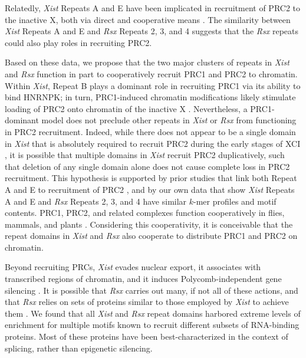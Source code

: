 Relatedly, \emph{Xist} Repeats A and E have been implicated in recruitment of PRC2 to the inactive X, both via direct and cooperative means \cite{Almeida2017PCGF3/5-PRC1Inactivation,Cifuentes-Rojas2014Regulatory2,Davidovich2015TowardRNA,Kohlmaier2004AInactivation,Ridings-Figueroa2017TheTerritory,Sunwoo2017RepeatCIZ1,Wang2017TargetingGuanines,Zhao2008PolycombChromosome}. The similarity between \emph{Xist} Repeats A and E and \emph{Rsx} Repeats 2, 3, and 4 suggests that the \emph{Rsx} repeats could also play roles in recruiting PRC2. 

Based on these data, we propose that the two major clusters of repeats in \emph{Xist} and \emph{Rsx} function in part to cooperatively recruit PRC1 and PRC2 to chromatin. Within \emph{Xist}, Repeat B plays a dominant role in recruiting PRC1 via its ability to bind HNRNPK; in turn, PRC1-induced chromatin modifications likely stimulate loading of PRC2 onto chromatin of the inactive X \cite{Almeida2017PCGF3/5-PRC1Inactivation,Pintacuda2017HnRNPKSilencing}. Nevertheless, a PRC1-dominant model does not preclude other repeats in \emph{Xist} or \emph{Rsx} from functioning in PRC2 recruitment. Indeed, while there does not appear to be a single domain in \emph{Xist} that is absolutely required to recruit PRC2 during the early stages of XCI \cite{Kohlmaier2004AInactivation,Wutz2002ChromosomalRNA}, it is possible that multiple domains in \emph{Xist} recruit PRC2 duplicatively, such that deletion of any single domain alone does not cause complete loss in PRC2 recruitment. This hypothesis is supported by prior studies that link both Repeat A and E to recruitment of PRC2 \cite{Almeida2017PCGF3/5-PRC1Inactivation,Cifuentes-Rojas2014Regulatory2,Davidovich2015TowardRNA,Kohlmaier2004AInactivation,Ridings-Figueroa2017TheTerritory,Sunwoo2017RepeatCIZ1,Wang2017TargetingGuanines,Zhao2008PolycombChromosome}, and by our own data that show \emph{Xist} Repeats A and E and \emph{Rsx} Repeats 2, 3, and 4 have similar $k$-mer profiles and motif contents. PRC1, PRC2, and related complexes function cooperatively in flies, mammals, and plants \cite{Blackledge2015TargetingStory,Li2018Polycomb-mediatedPlants,Schuettengruber2014CooperativityDrosophila}. Considering this cooperativity, it is conceivable that the repeat domains in \emph{Xist} and \emph{Rsx} also cooperate to distribute PRC1 and PRC2 on chromatin.

Beyond recruiting PRCs, \emph{Xist} evades nuclear export, it associates with transcribed regions of chromatin, and it induces Polycomb-independent gene silencing \cite{Balaton2018TheChromosome,Brockdorff2018LocalNcRNA,Sahakyan2018TheCompensation}. It is possible that \emph{Rsx} carries out many, if not all of these actions, and that \emph{Rsx} relies on sets of proteins similar to those employed by \emph{Xist} to achieve them \cite{Grant2012RsxInactivation,Wang2014Chromosome-wideDomestica}. We found that all \emph{Xist} and \emph{Rsx} repeat domains harbored extreme levels of enrichment for multiple motifs known to recruit different subsets of RNA-binding proteins. Most of these proteins have been best-characterized in the context of splicing, rather than epigenetic silencing.

